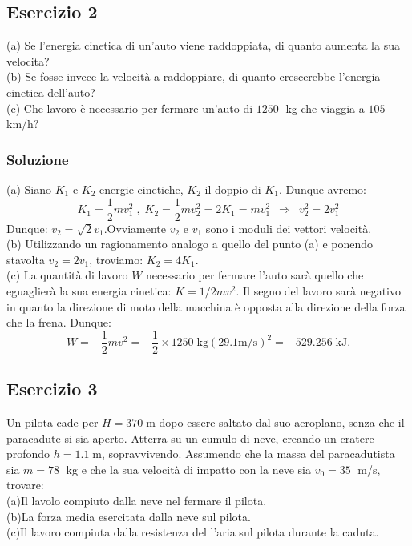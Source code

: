 \documentclass[12pt,a4paper]{book}
\begin{document}
\subsection*{Esercizio 2}
(a) Se l'energia cinetica di un'auto viene raddoppiata, di quanto aumenta la sua velocita?\\
(b) Se fosse invece la velocità a raddoppiare, di quanto crescerebbe l'energia cinetica dell'auto?\\
(c) Che lavoro è necessario per fermare un'auto di $1250\;$ kg che viaggia a $105\;$ km/h?

\subsubsection*{Soluzione}
(a) Siano $K_{1}$ e $K_{2}$ energie cinetiche, $K_{2}$ il doppio di $K_{1}$. Dunque avremo:
\begin{equation*}
K_1=\frac{1}{2}mv_{1}^{2}  \; , \;   K_2=\frac{1}{2}mv_{2}^{2}=2K_{1}=m v_{1}^{2}\, \, \,  \Rightarrow \, \, \,  v_{2}^{2}= 2 v_{1}^{2}
\end{equation*}
Dunque: $v_{2}=\sqrt{2}v_{1}$.Ovviamente $v_2$ e $v_1$ sono i moduli dei vettori velocità. \\

(b) Utilizzando un ragionamento analogo a quello del punto (a) e ponendo stavolta $v_{2}=2 v_{1}$, troviamo: $K_{2}=4 K_{1}$.\\

(c) La quantità di lavoro $W$ necessario per fermare l'auto sarà quello che eguaglierà la sua energia cinetica: $K=1/2m v^2$. Il segno del lavoro sarà negativo in quanto la direzione di moto della macchina è opposta alla direzione della forza che la frena. Dunque:
\begin{equation*}
W=-\frac{1}{2}m v^{2}=-\frac{1}{2}\times 1250\; \text{kg}  \left (29.1 \text{m}/\text{s} \right)^2=-529.256\; \text{kJ}.
\end{equation*}

\subsection*{Esercizio 3}
Un pilota cade per $H=370\;$m dopo essere saltato dal suo aeroplano, senza che il paracadute si sia aperto. Atterra su un cumulo di neve, creando un cratere profondo $h=1.1\;$m, sopravvivendo. Assumendo che la massa del paracadutista sia $m=78\;$ kg e che la sua velocità di impatto con la neve sia $v_{0}=35\;$ m/s, trovare:\\
(a)Il lavolo compiuto dalla neve nel fermare il pilota.\\
(b)La forza media esercitata dalla neve sul pilota.\\
(c)Il lavoro compiuta dalla resistenza del l'aria sul pilota durante la caduta.
\end{document}
